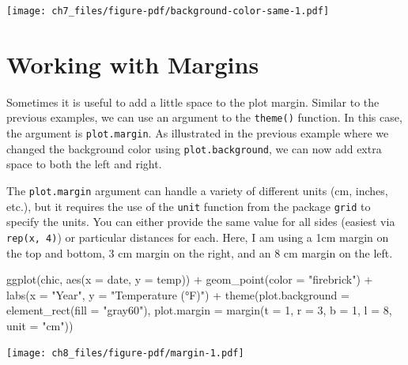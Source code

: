 \documentclass[
  letterpaper,
]{scrbook}
\newenvironment{Shaded}{\begin{snugshade}}{\end{snugshade}}
\newcommand{\AttributeTok}[1]{\textcolor[rgb]{0.40,0.45,0.13}{#1}}
\newcommand{\DecValTok}[1]{\textcolor[rgb]{0.68,0.00,0.00}{#1}}
\newcommand{\FunctionTok}[1]{\textcolor[rgb]{0.28,0.35,0.67}{#1}}
\newcommand{\NormalTok}[1]{\textcolor[rgb]{0.00,0.23,0.31}{#1}}
\newcommand{\SpecialCharTok}[1]{\textcolor[rgb]{0.37,0.37,0.37}{#1}}
\newcommand{\StringTok}[1]{\textcolor[rgb]{0.13,0.47,0.30}{#1}}
\begin{document}
\texttt{[image: ch7\_files/figure-pdf/background-color-same-1.pdf]}


\chapter{Working with Margins}\label{margins}

Sometimes it is useful to add a little space to the plot margin. Similar
to the previous examples, we can use an argument to the \texttt{theme()}
function. In this case, the argument is \texttt{plot.margin}. As
illustrated in the previous example where we changed the background
color using \texttt{plot.background}, we can now add extra space to both
the left and right.

The \texttt{plot.margin} argument can handle a variety of different
units (cm, inches, etc.), but it requires the use of the \texttt{unit}
function from the package \texttt{grid} to specify the units. You can
either provide the same value for all sides (easiest via
\texttt{rep(x,\ 4)}) or particular distances for each. Here, I am using
a 1cm margin on the top and bottom, 3 cm margin on the right, and an 8
cm margin on the left.

\begin{Shaded}
\begin{Highlighting}[]
\FunctionTok{ggplot}\NormalTok{(chic, }\FunctionTok{aes}\NormalTok{(}\AttributeTok{x =}\NormalTok{ date, }\AttributeTok{y =}\NormalTok{ temp)) }\SpecialCharTok{+}
  \FunctionTok{geom\_point}\NormalTok{(}\AttributeTok{color =} \StringTok{"firebrick"}\NormalTok{) }\SpecialCharTok{+}
  \FunctionTok{labs}\NormalTok{(}\AttributeTok{x =} \StringTok{"Year"}\NormalTok{, }\AttributeTok{y =} \StringTok{"Temperature (°F)"}\NormalTok{) }\SpecialCharTok{+}
  \FunctionTok{theme}\NormalTok{(}\AttributeTok{plot.background =} \FunctionTok{element\_rect}\NormalTok{(}\AttributeTok{fill =} \StringTok{"gray60"}\NormalTok{),}
        \AttributeTok{plot.margin =} \FunctionTok{margin}\NormalTok{(}\AttributeTok{t =} \DecValTok{1}\NormalTok{, }\AttributeTok{r =} \DecValTok{3}\NormalTok{, }\AttributeTok{b =} \DecValTok{1}\NormalTok{, }\AttributeTok{l =} \DecValTok{8}\NormalTok{, }\AttributeTok{unit =} \StringTok{"cm"}\NormalTok{))}
\end{Highlighting}
\end{Shaded}

\texttt{[image: ch8\_files/figure-pdf/margin-1.pdf]}
\end{document}

